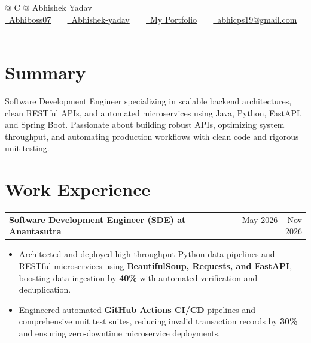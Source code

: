 \documentclass[a4paper,10pt]{article}
\makeatletter
\newenvironment{joblong}[2]
    {
    \begin{tabularx}{\linewidth}{@{}l X r@{}}
    \textbf{#1} & \hfill &  #2 \\[3.50pt]
    \end{tabularx}
    \begin{minipage}[t]{\linewidth}
    \begin{itemize}[nosep,after=\strut, leftmargin=1em, itemsep=3pt,label=--]
    }
    {
    \end{itemize}
    \end{minipage}
    }
\makeatother
\begin{document}
\pagestyle{empty}

\begin{tabularx}{\linewidth}{@{} C @{}}
\Huge{Abhishek Yadav}\\[7.5pt]
\href{https://github.com/Abhiboss07}{\raisebox{-0.05\height}\faGithub\ Abhiboss07} \ $|$ \
\href{https://linkedin.com/in/abhishek-yadav-4738032b7/}{\raisebox{-0.05\height}\faLinkedin\ Abhishek-yadav} \ $|$ \
\href{https://portfolio-abhishek-01.vercel.app}{\raisebox{-0.05\height}\faGlobe \ My Portfolio} \ $|$ \
\href{mailto:abhicps19@gmail.com}{\raisebox{-0.05\height}\faEnvelope \ abhicps19@gmail.com} \ \ \\
\end{tabularx}

\section{Summary}
Software Development Engineer specializing in scalable backend architectures, clean RESTful APIs, and automated microservices using Java, Python, FastAPI, and Spring Boot. Passionate about building robust APIs, optimizing system throughput, and automating production workflows with clean code and rigorous unit testing.

\section{Work Experience}

\begin{joblong}{Software Development Engineer (SDE) at Anantasutra}{May 2026 -- Nov 2026}
\item Architected and deployed high-throughput Python data pipelines and RESTful microservices using \textbf{BeautifulSoup, Requests, and FastAPI}, boosting data ingestion by \textbf{40\%} with automated verification and deduplication.
\item Engineered automated \textbf{GitHub Actions CI/CD} pipelines and comprehensive unit test suites, reducing invalid transaction records by \textbf{30\%} and ensuring zero-downtime microservice deployments.
\end{joblong}
\end{document}
